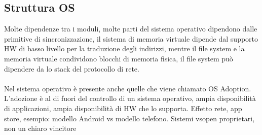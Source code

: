 \subsection{Struttura OS}
Molte dipendenze tra i moduli, molte parti del sistema operativo dipendono dalle primitive di sincronizzazione, 
il sistema di memoria virtuale dipende dal supporto HW di basso livello per la traduzione degli indirizzi, mentre il 
file system e la memoria virtuale condividono blocchi di memoria fisica, il file system può dipendere da lo stack del protocollo di rete.\\\\
Nel sistema operativo è presente anche quelle che viene chiamato OS Adoption. L'adozione è al di fuori del controllo di un sistema operativo, ampia disponibilità di applicazioni, 
ampia disponibilità di HW che lo supporta. Effetto rete, app store, esempio: modello Android vs modello telefono. Sistemi vsopen proprietari, non un chiaro vincitore

